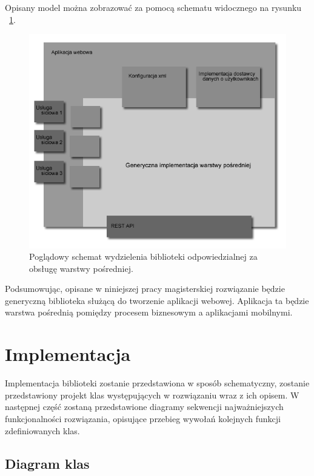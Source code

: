 Opisany model można zobrazować za pomocą schematu widocznego na rysunku ~\ref{fig:middlewareGenericConcept}.

\begin{figure}[h]
\centerline{\includegraphics[scale=0.6]{middlewareGenericConcept}}
\caption{Poglądowy schemat wydzielenia biblioteki odpowiedzialnej za obsługę warstwy pośredniej.}
\label{fig:middlewareGenericConcept}
\end{figure}

Podsumowując, opisane w niniejszej pracy magisterskiej rozwiązanie będzie generyczną biblioteka służącą do tworzenie aplikacji webowej. Aplikacja ta będzie warstwa pośrednią pomiędzy procesem biznesowym a aplikacjami mobilnymi. 


\section{Implementacja}
\label{sec:impl}

Implementacja biblioteki zostanie przedstawiona w sposób schematyczny, zostanie przedstawiony projekt klas występujących w rozwiązaniu wraz z ich opisem. W następnej część zostaną przedstawione diagramy sekwencji najważniejszych funkcjonalności rozwiązania, opisujące przebieg wywołań kolejnych funkcji zdefiniowanych klas. 

\subsection{Diagram klas}

